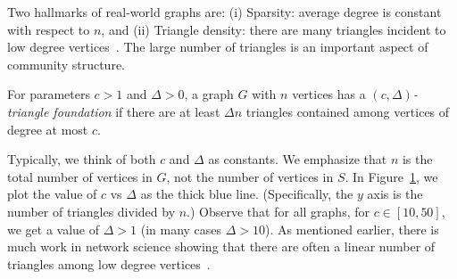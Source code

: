 \documentclass[11pt]{article}
\begin{document}
\begin{figure}
				 \label{fig:intro-triangle-distro}
\end{figure}

Two hallmarks of real-world graphs are: (i) Sparsity: average degree is constant with respect
to $n$, and (ii) Triangle density: there are many triangles incident to low degree vertices~\cite{WaSt98,SaCaWi+10,SeKoPi12,DuPi+12}.
The large number of triangles is an important aspect of community structure. 

\begin{definition} \label{def:foundation} For parameters $c > 1$ and $\Delta > 0$, a graph $G$ with $n$ vertices
has a \emph{$(c,\Delta)$-triangle foundation} if there are at least $\Delta n$ triangles contained among vertices of degree at most $c$.
\end{definition}

Typically, we think of both $c$ and $\Delta$ as constants. 
{We emphasize that $n$ is the total number of vertices in $G$, not the number
of vertices in $S$.}
In Figure~\ref{fig:intro-triangle-distro}, we plot the value
of $c$ vs $\Delta$ as the thick blue line. (Specifically, the $y$ axis is the number of triangles divided by $n$.)
Observe that for all graphs,
for $c \in [10,50]$, we get a value of $\Delta > 1$ (in many cases $\Delta > 10$). 
As mentioned earlier, there is much work in network science showing that there are often a linear
number of triangles among low degree vertices~\cite{SeKoPi12,DuPi+12}.
\end{document}
